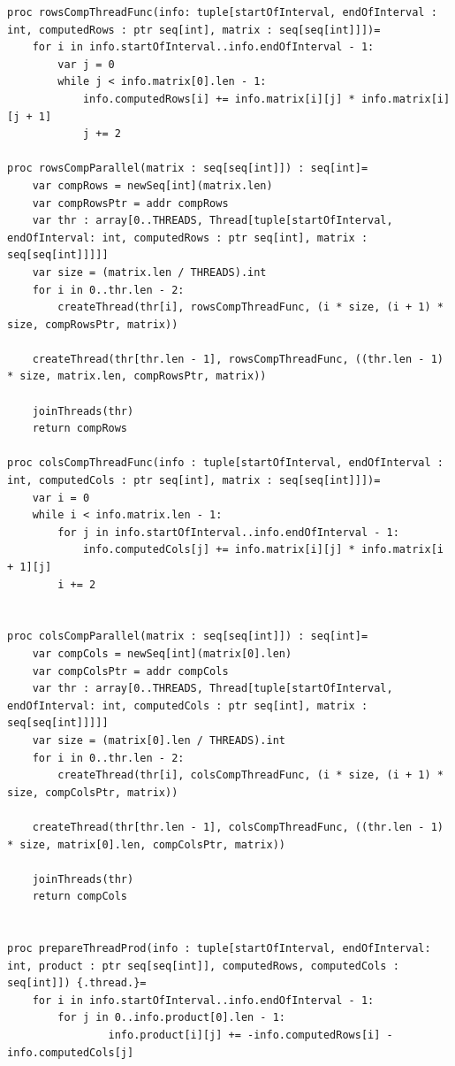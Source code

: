 \documentclass[12pt]{report}
\begin{document}
\begin{lstlisting}[caption=Реализация первой схемы параллельного алгоритма Копперсмита-Винограда,
label={list:paral}]
proc rowsCompThreadFunc(info: tuple[startOfInterval, endOfInterval : int, computedRows : ptr seq[int], matrix : seq[seq[int]]])=
    for i in info.startOfInterval..info.endOfInterval - 1:
        var j = 0
        while j < info.matrix[0].len - 1:
            info.computedRows[i] += info.matrix[i][j] * info.matrix[i][j + 1]
            j += 2

proc rowsCompParallel(matrix : seq[seq[int]]) : seq[int]=
    var compRows = newSeq[int](matrix.len)
    var compRowsPtr = addr compRows
    var thr : array[0..THREADS, Thread[tuple[startOfInterval, endOfInterval: int, computedRows : ptr seq[int], matrix : seq[seq[int]]]]]
    var size = (matrix.len / THREADS).int
    for i in 0..thr.len - 2:
        createThread(thr[i], rowsCompThreadFunc, (i * size, (i + 1) * size, compRowsPtr, matrix))

    createThread(thr[thr.len - 1], rowsCompThreadFunc, ((thr.len - 1) * size, matrix.len, compRowsPtr, matrix))

    joinThreads(thr)
    return compRows

proc colsCompThreadFunc(info : tuple[startOfInterval, endOfInterval : int, computedCols : ptr seq[int], matrix : seq[seq[int]]])=
    var i = 0
    while i < info.matrix.len - 1:
        for j in info.startOfInterval..info.endOfInterval - 1:
            info.computedCols[j] += info.matrix[i][j] * info.matrix[i + 1][j]
        i += 2


proc colsCompParallel(matrix : seq[seq[int]]) : seq[int]=
    var compCols = newSeq[int](matrix[0].len)
    var compColsPtr = addr compCols
    var thr : array[0..THREADS, Thread[tuple[startOfInterval, endOfInterval: int, computedCols : ptr seq[int], matrix : seq[seq[int]]]]]
    var size = (matrix[0].len / THREADS).int
    for i in 0..thr.len - 2:
        createThread(thr[i], colsCompThreadFunc, (i * size, (i + 1) * size, compColsPtr, matrix))

    createThread(thr[thr.len - 1], colsCompThreadFunc, ((thr.len - 1) * size, matrix[0].len, compColsPtr, matrix))

    joinThreads(thr)
    return compCols


proc prepareThreadProd(info : tuple[startOfInterval, endOfInterval: int, product : ptr seq[seq[int]], computedRows, computedCols : seq[int]]) {.thread.}=
    for i in info.startOfInterval..info.endOfInterval - 1:
        for j in 0..info.product[0].len - 1:
                info.product[i][j] += -info.computedRows[i] - info.computedCols[j]


\end{lstlisting}
\end{document}
